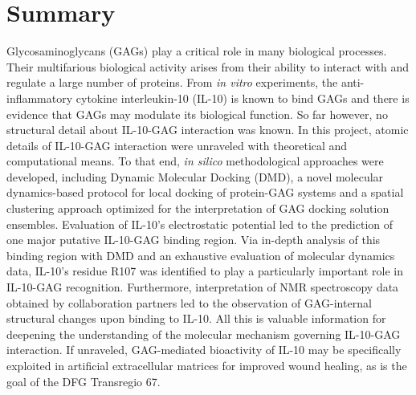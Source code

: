 \chapter{Summary}


Glycosaminoglycans (GAGs) play a critical role in many biological processes.
Their multifarious biological activity arises from their ability to interact
with and regulate a large number of proteins. From \textit{in vitro}
experiments, the anti-inflammatory cytokine interleukin-10 (IL-10) is known to
bind GAGs and there is evidence that GAGs may modulate its biological function.
So far however, no structural detail about IL-10-GAG interaction was known. In
this project, atomic details of IL-10-GAG interaction were unraveled with
theoretical and computational means. To that end, \textit{in silico}
methodological approaches were developed, including Dynamic Molecular Docking
(DMD), a novel molecular dynamics-based protocol for local docking of
protein-GAG systems and a spatial clustering approach optimized for the
interpretation of GAG docking solution ensembles. Evaluation of IL-10's
electrostatic potential led to the prediction of one major putative IL-10-GAG
binding region. Via in-depth analysis of this binding region with DMD and an
exhaustive evaluation of molecular dynamics data, IL-10's residue R107 was
identified to play a particularly important role in IL-10-GAG recognition.
Furthermore, interpretation of NMR spectroscopy data obtained by collaboration
partners led to the observation of GAG-internal structural changes upon binding
to IL-10. All this is valuable information for deepening the understanding of
the molecular mechanism governing IL-10-GAG interaction. If unraveled,
GAG-mediated bioactivity of IL-10 may be specifically exploited in artificial
extracellular matrices for improved wound healing, as is the goal of the DFG
Transregio 67.

\lipsum[1-4]